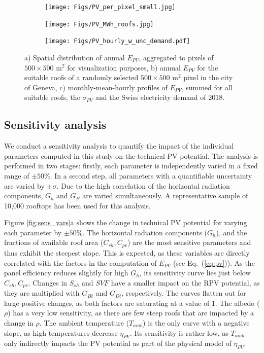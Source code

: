 \begin{figure}[t]
\centering
\begin{subfigure}{.63\textwidth}
  \centering
  \texttt{[image: Figs/PV\_per\_pixel\_small.jpg]}
  \subcaption{}
\end{subfigure}
\begin{subfigure}{.34\textwidth}
  \centering
  \texttt{[image: Figs/PV\_MWh\_roofs.jpg]}
  \subcaption{}
\end{subfigure}
\begin{subfigure}{.95\textwidth}
  \centering
  \texttt{[image: Figs/PV\_hourly\_w\_unc\_demand.pdf]} 
  \subcaption{}
\end{subfigure}
\caption{a) Spatial distribution of annual $E_{PV}$, aggregated to pixels of $500 \times 500$ m$^2$ for visualization purposes, 
b) annual $E_{PV}$ for the suitable roofs of a randomly selected $500 \times 500$ m$^2$ pixel in the city of Geneva,
c) monthly-mean-hourly profiles of $E_{PV}$, summed for all suitable roofs, the $\sigma_{PV}$ and the Swiss electricity demand of 2018.}
\label{fig:results}
\end{figure}

\subsection{Sensitivity analysis}

We conduct a sensitivity analysis to quantify the impact of the individual parameters computed in this study on the technical PV potential. The analysis is performed in two stages: firstly, each parameter is independently varied in a fixed range of $\pm 50\%$. 
In a second step, all parameters with a quantifiable uncertainty are varied by $\pm \sigma$. 
Due to the high correlation of the horizontal radiation components, $G_h$ and $G_B$ are varied simultaneously. A representative sample of 10,000 rooftops has been used for this analysis.

Figure \ref{fig:sens_vars}a shows the change in technical PV potential for varying each parameter by $\pm 50\%$. The horizontal radiation components ($G_h$), and the fractions of available roof area ($C_{sh}, C_{\mathit{pv}}$) are the most sensitive parameters and thus exhibit the steepest slope. 
This is expected, as these variables are directly correlated with the factors in the computation of $E_{PV}$ (see Eq.~(\ref{eq:pv})). 
As the panel efficiency reduces slightly for high $G_h$, its sensitivity curve lies just below $C_{sh}, C_{\mathit{pv}}$.
Changes in $S_{sh}$ and $\mathit{SVF}$ have a smaller impact on the RPV potential, as they are multiplied with $G_{Bt}$ and $G_{Dt}$, respectively. 
The curves flatten out for large positive changes, as both factors are saturating at a value of 1. 
The albedo ($\rho$) has a very low sensitivity, as there are few steep roofs that are impacted by a change in $\rho$.
The ambient temperature ($T_{amb}$) is the only curve with a negative slope, as high temperatures decrease $\eta_{PV}$. Its sensitivity is rather low, as $T_{amb}$ only indirectly impacts the PV potential as part of the physical model of $\eta_{PV}$. 

